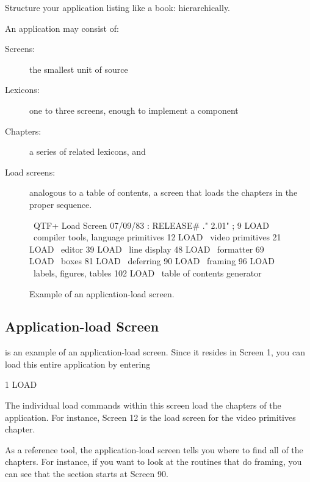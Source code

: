 \begin{tip}
Structure your application listing like a book: hierarchically.
\end{tip}
An application may consist of:
\begin{description}
\item[Screens:] the smallest unit of \Forth{} source
\item[Lexicons:] one to three screens, enough to implement a component
\item[Chapters:] a series of related lexicons, and
\item[Load screens:] analogous to a table of contents, a screen that loads the
chapters in the proper sequence.
\end{description}
\begin{figure*}[tttt]
\caption{Example of an application-load screen.}
\setcounter{screen}{1}
\begin{Screen}
\ QTF+ Load Screen                                      07/09/83
: RELEASE#   ." 2.01" ;
  9 LOAD \ compiler tools, language primitives
 12 LOAD \ video primitives
 21 LOAD \ editor
 39 LOAD \ line display
 48 LOAD \ formatter
 69 LOAD \ boxes
 81 LOAD \ deferring
 90 LOAD \ framing
 96 LOAD \ labels, figures, tables
102 LOAD \ table of contents generator




\end{Screen}
\end{figure*}

\subsection{Application-load Screen}

 is an example of an application-load screen.  Since it resides in
Screen 1, you can load this entire application by entering
\begin{Code}
1 LOAD
\end{Code}
The individual load commands within this screen load the chapters of the
application.  For instance, Screen 12 is the load screen for the video
primitives chapter.

As a reference tool, the application-load screen tells you where to
find all of the chapters.  For instance, if you want to look at the routines
that do framing, you can see that the section starts at Screen 90.

